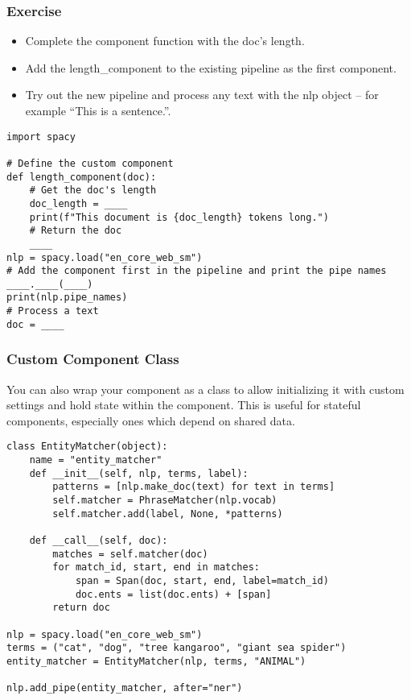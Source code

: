 \begin{frame}[fragile]\frametitle{Exercise}

  \begin{itemize}
    \item Complete the component function with the doc’s length.
    \item Add the length\_component to the existing pipeline as the first component.
    \item Try out the new pipeline and process any text with the nlp object – for example “This is a sentence.”.
  \end{itemize}

  \begin{lstlisting}
import spacy

# Define the custom component
def length_component(doc):
    # Get the doc's length
    doc_length = ____
    print(f"This document is {doc_length} tokens long.")
    # Return the doc
    ____
nlp = spacy.load("en_core_web_sm")
# Add the component first in the pipeline and print the pipe names
____.____(____)
print(nlp.pipe_names)
# Process a text
doc = ____
  \end{lstlisting}
	
\end{frame}


\begin{frame}[fragile]\frametitle{Custom Component Class}
You can also wrap your component as a class to allow initializing it with custom settings and hold state within the component. This is useful for stateful components, especially ones which depend on shared data.
		\begin{lstlisting}
class EntityMatcher(object):
    name = "entity_matcher"
    def __init__(self, nlp, terms, label):
        patterns = [nlp.make_doc(text) for text in terms]
        self.matcher = PhraseMatcher(nlp.vocab)
        self.matcher.add(label, None, *patterns)

    def __call__(self, doc):
        matches = self.matcher(doc)
        for match_id, start, end in matches:
            span = Span(doc, start, end, label=match_id)
            doc.ents = list(doc.ents) + [span]
        return doc

nlp = spacy.load("en_core_web_sm")
terms = ("cat", "dog", "tree kangaroo", "giant sea spider")
entity_matcher = EntityMatcher(nlp, terms, "ANIMAL")

nlp.add_pipe(entity_matcher, after="ner")
\end{lstlisting}	
	
\end{frame}

